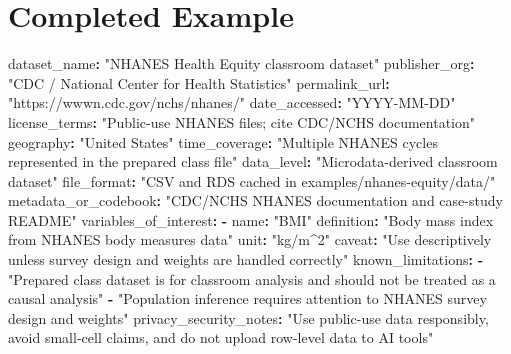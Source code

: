 \documentclass[
  letterpaper,
  DIV=11,
  numbers=noendperiod,
  oneside]{scrreprt}
\newenvironment{Shaded}{\begin{snugshade}}{\end{snugshade}}
\newcommand{\AttributeTok}[1]{\textcolor[rgb]{0.40,0.45,0.13}{#1}}
\newcommand{\FunctionTok}[1]{\textcolor[rgb]{0.28,0.35,0.67}{#1}}
\newcommand{\KeywordTok}[1]{\textcolor[rgb]{0.00,0.23,0.31}{\textbf{#1}}}
\newcommand{\StringTok}[1]{\textcolor[rgb]{0.13,0.47,0.30}{#1}}
\begin{document}
\section*{Completed Example}\label{completed-example}


\begin{Shaded}
\begin{Highlighting}[numbers=left,,]
\FunctionTok{dataset\_name}\KeywordTok{:}\AttributeTok{ }\StringTok{"NHANES Health Equity classroom dataset"}
\FunctionTok{publisher\_org}\KeywordTok{:}\AttributeTok{ }\StringTok{"CDC / National Center for Health Statistics"}
\FunctionTok{permalink\_url}\KeywordTok{:}\AttributeTok{ }\StringTok{"https://wwwn.cdc.gov/nchs/nhanes/"}
\FunctionTok{date\_accessed}\KeywordTok{:}\AttributeTok{ }\StringTok{"YYYY{-}MM{-}DD"}
\FunctionTok{license\_terms}\KeywordTok{:}\AttributeTok{ }\StringTok{"Public{-}use NHANES files; cite CDC/NCHS documentation"}
\FunctionTok{geography}\KeywordTok{:}\AttributeTok{ }\StringTok{"United States"}
\FunctionTok{time\_coverage}\KeywordTok{:}\AttributeTok{ }\StringTok{"Multiple NHANES cycles represented in the prepared class file"}
\FunctionTok{data\_level}\KeywordTok{:}\AttributeTok{ }\StringTok{"Microdata{-}derived classroom dataset"}
\FunctionTok{file\_format}\KeywordTok{:}\AttributeTok{ }\StringTok{"CSV and RDS cached in examples/nhanes{-}equity/data/"}
\FunctionTok{metadata\_or\_codebook}\KeywordTok{:}\AttributeTok{ }\StringTok{"CDC/NCHS NHANES documentation and case{-}study README"}
\FunctionTok{variables\_of\_interest}\KeywordTok{:}
\AttributeTok{  }\KeywordTok{{-}}\AttributeTok{ }\FunctionTok{name}\KeywordTok{:}\AttributeTok{ }\StringTok{"BMI"}
\AttributeTok{    }\FunctionTok{definition}\KeywordTok{:}\AttributeTok{ }\StringTok{"Body mass index from NHANES body measures data"}
\AttributeTok{    }\FunctionTok{unit}\KeywordTok{:}\AttributeTok{ }\StringTok{"kg/m\^{}2"}
\AttributeTok{    }\FunctionTok{caveat}\KeywordTok{:}\AttributeTok{ }\StringTok{"Use descriptively unless survey design and weights are handled correctly"}
\FunctionTok{known\_limitations}\KeywordTok{:}
\AttributeTok{  }\KeywordTok{{-}}\AttributeTok{ }\StringTok{"Prepared class dataset is for classroom analysis and should not be treated as a causal analysis"}
\AttributeTok{  }\KeywordTok{{-}}\AttributeTok{ }\StringTok{"Population inference requires attention to NHANES survey design and weights"}
\FunctionTok{privacy\_security\_notes}\KeywordTok{:}\AttributeTok{ }\StringTok{"Use public{-}use data responsibly, avoid small{-}cell claims, and do not upload row{-}level data to AI tools"}

\end{Highlighting}
\end{Shaded}
\end{document}
